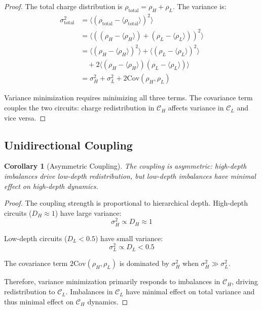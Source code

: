 \documentclass[12pt,a4paper]{article}
\theoremstyle{plain}
\newtheorem{corollary}[theorem]{Corollary}
\theoremstyle{definition}
\theoremstyle{remark}
\begin{document}
\begin{proof}
The total charge distribution is $\rho_{\text{total}} = \rho_H + \rho_L$. The variance is:
\begin{align}
\sigma^2_{\text{total}} &= \langle (\rho_{\text{total}} - \langle \rho_{\text{total}} \rangle)^2 \rangle \\
&= \langle ((\rho_H - \langle \rho_H \rangle) + (\rho_L - \langle \rho_L \rangle))^2 \rangle \\
&= \langle (\rho_H - \langle \rho_H \rangle)^2 \rangle + \langle (\rho_L - \langle \rho_L \rangle)^2 \rangle \\
&\quad + 2 \langle (\rho_H - \langle \rho_H \rangle)(\rho_L - \langle \rho_L \rangle) \rangle \\
&= \sigma^2_H + \sigma^2_L + 2 \text{Cov}(\rho_H, \rho_L)
\end{align}

Variance minimization requires minimizing all three terms. The covariance term couples the two circuits: charge redistribution in $\mathcal{C}_H$ affects variance in $\mathcal{C}_L$ and vice versa.
\end{proof}

\subsection{Unidirectional Coupling}

\begin{corollary}[Asymmetric Coupling]
\label{cor:asymmetric}
The coupling is asymmetric: high-depth imbalances drive low-depth redistribution, but low-depth imbalances have minimal effect on high-depth dynamics.
\end{corollary}

\begin{proof}
The coupling strength is proportional to hierarchical depth. High-depth circuits ($D_H \approx 1$) have large variance:
\begin{equation}
\sigma^2_H \propto D_H \approx 1
\end{equation}

Low-depth circuits ($D_L < 0.5$) have small variance:
\begin{equation}
\sigma^2_L \propto D_L < 0.5
\end{equation}

The covariance term $2 \text{Cov}(\rho_H, \rho_L)$ is dominated by $\sigma^2_H$ when $\sigma^2_H \gg \sigma^2_L$.

Therefore, variance minimization primarily responds to imbalances in $\mathcal{C}_H$, driving redistribution to $\mathcal{C}_L$. Imbalances in $\mathcal{C}_L$ have minimal effect on total variance and thus minimal effect on $\mathcal{C}_H$ dynamics.
\end{proof}
\end{document}

